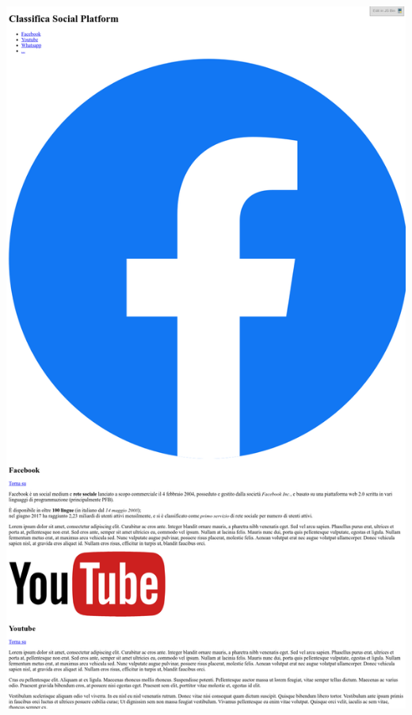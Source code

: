 \documentclass[11pt]{report}
\begin{document}
\begin{center}
\includegraphics[scale=0.3]{img/9.PNG}
\thispagestyle{empty}
\end{center}


\end{document}
